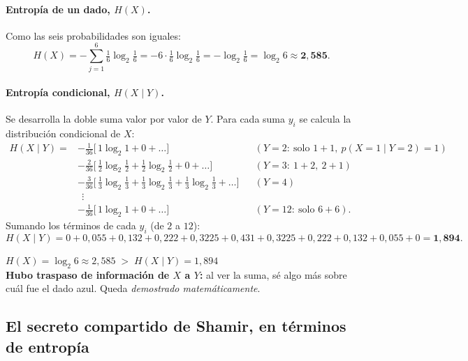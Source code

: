 \documentclass[11pt,a4paper]{article}
\begin{document}
\paragraph{Entropía de un dado, $H(X)$.} Como las seis probabilidades son iguales:
\[
H(X) = -\sum_{j=1}^{6}\tfrac{1}{6}\log_2\tfrac{1}{6}
     = -6\cdot\tfrac{1}{6}\log_2\tfrac{1}{6}
     = -\log_2\tfrac{1}{6}
     = \log_2 6 \approx \mathbf{2{,}585}.
\]

\paragraph{Entropía condicional, $H(X\mid Y)$.} Se desarrolla la doble suma valor por valor de
$Y$. Para cada suma $y_i$ se calcula la distribución condicional de $X$:
\[
\begin{aligned}
H(X\mid Y) ={}& -\tfrac{1}{36}\bigl[\,1\log_2 1 + 0 + \dots\bigr]
   && (Y{=}2:\ \text{solo } 1{+}1,\ p(X{=}1\mid Y{=}2)=1)\\
& -\tfrac{2}{36}\bigl[\,\tfrac12\log_2\tfrac12 + \tfrac12\log_2\tfrac12 + 0 + \dots\bigr]
   && (Y{=}3:\ 1{+}2,\ 2{+}1)\\
& -\tfrac{3}{36}\bigl[\,\tfrac13\log_2\tfrac13 + \tfrac13\log_2\tfrac13 + \tfrac13\log_2\tfrac13 + \dots\bigr]
   && (Y{=}4)\\
& \ \ \vdots \\
& -\tfrac{1}{36}\bigl[\,1\log_2 1 + 0 + \dots\bigr]
   && (Y{=}12:\ \text{solo } 6{+}6).
\end{aligned}
\]
Sumando los términos de cada $y_i$ (de $2$ a $12$):
\[
H(X\mid Y) = 0 + 0{,}055 + 0{,}132 + 0{,}222 + 0{,}3225 + 0{,}431
           + 0{,}3225 + 0{,}222 + 0{,}132 + 0{,}055 + 0 = \mathbf{1{,}894}.
\]

\begin{tcolorbox}[enhanced,colback=practGreenL,colframe=practGreen,boxrule=1pt,arc=2pt]
\centering\large
$H(X) = \log_2 6 \approx 2{,}585 \;>\; H(X\mid Y) = 1{,}894$
\\[4pt]
\normalsize \textbf{Hubo traspaso de información de $X$ a $Y$:} al ver la suma, sé algo más
sobre cuál fue el dado azul. Queda \emph{demostrado matemáticamente}.
\end{tcolorbox}

\subsection{El secreto compartido de Shamir, en términos de entropía}
\end{document}
